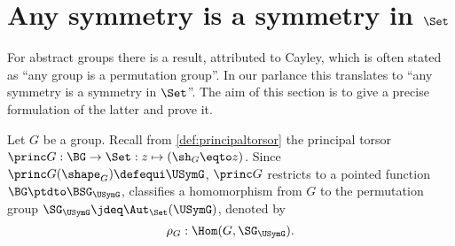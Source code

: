 \section{Any symmetry is a symmetry in $\Set$}
\label{sec:groupssubperm}


For abstract groups there is a result, attributed to Cayley,
which is often stated as ``any group is a permutation group''. 
In our parlance this translates to ``any symmetry is a symmetry in $\Set$''.
The aim of this section is to give a precise formulation of the latter
and prove it.

Let $G$ be a group.
Recall from \cref{def:principaltorsor} the principal torsor
$\princ G:\BG\to\Set: z\mapsto (\sh_G\eqto z)$.
Since $\princ G (\shape_G)\defequi \USymG$, $\princ G$ restricts to
a pointed function $\BG\ptdto \BSG_{\USymG}$, 
 \ie 
classifies a homomorphism from $G$ to the permutation group 
$\SG_{\USymG}\jdeq \Aut_{\Set}(\USymG)$,
denoted by $$\rho_G:\Hom(G,\SG_{\USymG}).$$

